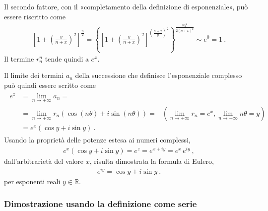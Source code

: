 \documentclass[letterpaper,10pt,italian]{jupyterBook}
\begin{document}
\sphinxAtStartPar
Il secondo fattore, con il «completamento della definizione di esponenziale», può essere riscritto come
\begin{equation*}
\begin{split}\left[ 1 + \left(\frac{y}{n+x}\right)^2 \right]^{\frac{n}{2}} = \left\{ \left[ 1 + \left(\frac{y}{n+x}\right)^2 \right]^{\left(\frac{n+x}{y}\right)^2} \right\}^{\frac{n y^2}{2(n+x)^2}} \sim e^0 = 1 \ .\end{split}
\end{equation*}
\sphinxAtStartPar
Il termine \(r_n^n\) tende quindi a \(e^x\).

\sphinxAtStartPar
Il limite dei termini \(a_n\) della successione che definisce l’esponenziale complesso può quindi essere scritto come
\begin{equation*}
\begin{split}\begin{aligned}
  e^z & = \lim_{n \rightarrow +\infty} a_n = \\
      & = \lim_{n \rightarrow +\infty} r_n (\cos(n\theta) + i \sin(n\theta)) =  & (\lim_{n\rightarrow +\infty} r_n = e^x, \lim_{n \rightarrow + \infty} n \theta = y)\\
      & = e^x \left( \cos y + i \sin y \right) \ .
\end{aligned}\end{split}
\end{equation*}
\sphinxAtStartPar
Usando la proprietà delle potenze estesa ai numeri complessi,
\begin{equation*}
\begin{split}e^x \left( \cos y + i \sin y \right) = e^z = e^{x + iy} = e^x \, e^{i y} \ ,
\end{split}
\end{equation*}
\sphinxAtStartPar
dall’arbitrarietà del valore \(x\), risulta dimostrata la formula di Eulero,
\begin{equation*}
\begin{split}e^{iy} = \cos y + i \sin y \ .\end{split}
\end{equation*}
\sphinxAtStartPar
per esponenti reali \(y \in \mathbb{R}\).
\subsubsection*{Dimostrazione usando la definizione come serie}
\end{document}
